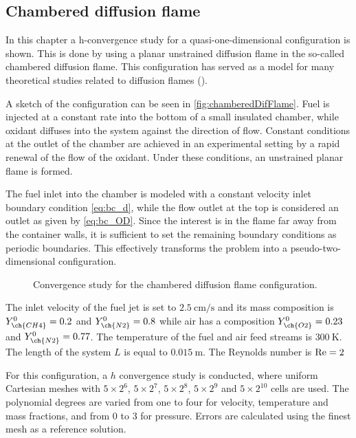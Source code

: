 \subsection{Chambered diffusion flame}\label{ss:UDF}
In this chapter a h-convergence study for a quasi-one-dimensional configuration is shown. This is done by using a planar unstrained diffusion flame in the so-called chambered diffusion flame. This configuration has served as a model for many theoretical studies related to diffusion flames (\textcite{matalonEffectThermalExpansion2010,rameauNumericalBifurcationChambered1985,matalonDiffusionFlamesChamber1980}). 

A sketch of the configuration can be seen in \cref{fig:chamberedDifFlame}. Fuel is injected at a constant rate into the bottom of a small insulated chamber, while oxidant diffuses into the system against the direction of flow. Constant conditions at the outlet of the chamber are achieved in an experimental setting by a rapid renewal of the flow of the oxidant. Under these conditions, an unstrained planar flame is formed.

The fuel inlet into the chamber is modeled with a constant velocity inlet boundary condition \cref{eq:bc_d}, while the flow outlet at the top is considered an outlet as given by \cref{eq:bc_OD}. Since the interest is in the flame far away from the container walls, it is sufficient to set the remaining boundary conditions as periodic boundaries. This effectively transforms the problem into a pseudo-two-dimensional configuration.

\begin{figure}[t!]
	\centering
	\pgfplotsset{width=0.34\textwidth, compat=1.3}
	\caption{Convergence study for the chambered diffusion flame configuration.}
	\label{ConvergenceDiffFlame}
\end{figure}
The inlet velocity of the fuel jet is set to $\SI{2.5}{\centi\meter \per \second}$ and its mass composition is $Y^0_{\ch{CH4}} = 0.2$ and $Y^0_{\ch{N2}} = 0.8$ while air has a composition $Y^0_{\ch{O2}} = 0.23$ and $Y^0_{\ch{N2}} = 0.77$. The temperature of the fuel and air feed streams is $\SI{300}{\kelvin}$. The length of the system $L$ is equal to $\SI{0.015}{\meter}$. The Reynolds number is $\text{Re} = 2$

For this configuration, a $h$ convergence study is conducted, where uniform Cartesian meshes with $5\times2^6$, $5\times2^7$, $5\times2^8$,  $5\times2^9$ and $5\times2^{10}$  cells are used. The polynomial degrees are varied from one to four for velocity, temperature and mass fractions, and from 0 to 3 for pressure.  Errors are calculated using the finest mesh as a reference solution.  

